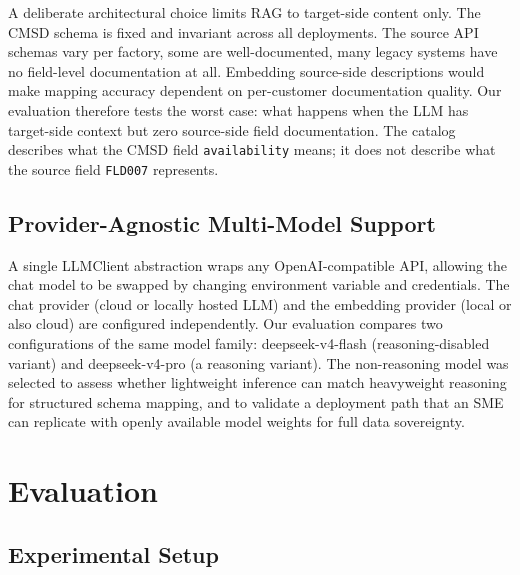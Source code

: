 \documentclass[3p,times,procedia]{elsarticle}
\begin{document}
A deliberate architectural choice limits RAG to target-side content only. The CMSD schema is fixed and invariant across all deployments. The source API schemas vary per factory, some are well-documented, many legacy systems have no field-level documentation at all. Embedding source-side descriptions would make mapping accuracy dependent on per-customer documentation quality. Our evaluation therefore tests the worst case: what happens when the LLM has target-side context but zero source-side field documentation. The catalog describes what the CMSD field \texttt{availability} means; it does not describe what the source field \texttt{FLD007} represents.

\subsection{Provider-Agnostic Multi-Model Support}
\label{sec:pipeline-models}

A single LLMClient abstraction wraps any OpenAI-compatible API, allowing the chat model to be swapped by changing environment variable and credentials. The chat provider (cloud or locally hosted LLM) and the embedding provider (local or also cloud) are configured independently. Our evaluation compares two configurations of the same model family: deepseek-v4-flash (reasoning-disabled variant) and deepseek-v4-pro (a reasoning variant). The non-reasoning model was selected to assess whether lightweight inference can match heavyweight reasoning for structured schema mapping, and to validate a deployment path that an SME can replicate with openly available model weights for full data sovereignty.

\section{Evaluation}
\label{sec:evaluation}

\subsection{Experimental Setup}
\label{sec:eval-setup}
\end{document}
